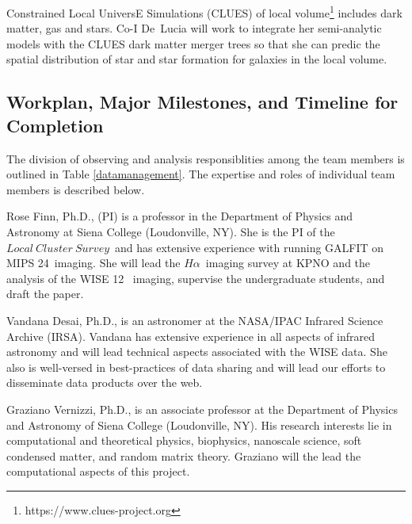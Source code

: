 \documentclass[11pt, preprint]{aastex}
\newcommand{\ha}{$H\alpha$}
\newcommand{\lcs}{$Local \ Cluster \ Survey $}
\begin{document}
{Constrained Local UniversE Simulations (CLUES) of local
volume\footnote{https://www.clues-project.org} includes dark matter,
gas and stars.
Co-I De~Lucia will work to integrate her semi-analytic models with the
CLUES  dark matter merger trees so that she can predic the spatial
distribution of star and star formation for galaxies in the local volume.

\vspace*{-.9cm}\subsection{Workplan, Major Milestones, and Timeline for Completion }
\vspace*{-.3cm}
The division of observing and analysis responsiblities among the team
members is outlined in Table \ref{datamanagement}.   The expertise and
roles of individual team members is described below.

Rose Finn, Ph.D., (PI) is a professor in the Department of Physics
and Astronomy at Siena College (Loudonville, NY).  She is the PI of
the \lcs \ and has extensive experience with running GALFIT on MIPS
24\micron \ imaging.  She will lead the \ha \ imaging survey at KPNO
and the analysis of the WISE 12\micron
\ imaging, supervise the undergraduate students, and draft the paper.

Vandana Desai, Ph.D., is an astronomer at the NASA/IPAC Infrared
  Science Archive (IRSA).   Vandana has extensive experience
in all aspects of infrared astronomy and will lead technical aspects
associated with the WISE data.  
She also is well-versed in best-practices of data sharing and will
lead our efforts to disseminate data products over the web.

Graziano Vernizzi, Ph.D., is an associate professor at the Department of
Physics and Astronomy of Siena College (Loudonville, NY).
His research interests lie in computational and theoretical
physics, biophysics, nanoscale science, soft condensed matter, and
random matrix theory. 
Graziano will the lead the computational
aspects of this project.

}
\end{document}
